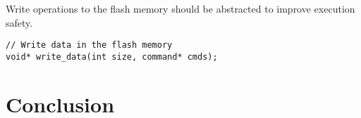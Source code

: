 \documentclass[12pt,twoside,a4paper]{article}
\begin{document}
Write operations to  the flash memory should be  abstracted to improve
execution safety.

\begin{lstlisting}
// Write data in the flash memory
void* write_data(int size, command* cmds);
\end{lstlisting}



\section{Conclusion}
\label{sec:conclusion}


\def\URL#1{{\\\footnotesize\url{#1}}}




\tableofcontents
\end{document}
